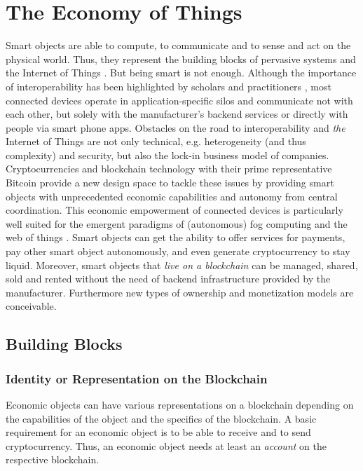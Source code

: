 \chapter{The Economy of Things}
\label{sec:economy}

Smart objects are able to compute, to communicate and to sense and act on the physical world. Thus, they represent the building blocks of pervasive systems and the Internet of Things \cite{kortuem2010smart}. But being smart is not enough. Although the importance of interoperability has been highlighted by scholars \cite{zorzi2010} and practitioners \cite{manyika2015unlocking}, most connected devices operate in application-specific silos and communicate not with each other, but solely with the manufacturer's backend services or directly with people via smart phone apps.
Obstacles on the road to interoperability and \textit{the} Internet of Things are not only technical, e.g. heterogeneity (and thus complexity) and security, but also the lock-in business model of companies.
Cryptocurrencies and blockchain technology with their prime representative Bitcoin provide a new design space to tackle these issues by providing smart objects with unprecedented economic capabilities and autonomy from central coordination. This economic empowerment of connected devices is particularly well suited for the emergent paradigms of (autonomous) fog computing \cite{Bonomi:2012:FCR:2342509.2342513} and the web of things . Smart objects can get the ability to offer services for payments, pay other smart object autonomously, and even generate cryptocurrency to stay liquid. Moreover, smart objects that \textit{live on a blockchain} can be managed, shared, sold and rented without the need of backend infrastructure provided by the manufacturer. Furthermore new types of ownership and monetization models are conceivable.


\section{Building Blocks}

\subsection{Identity or Representation on the Blockchain}

Economic objects can have various representations on a blockchain depending on the capabilities of the object and the specifics of the blockchain. A basic requirement for an economic object is to be able to receive and to send cryptocurrency. Thus, an economic object needs at least an \emph{account} on the respective blockchain.

